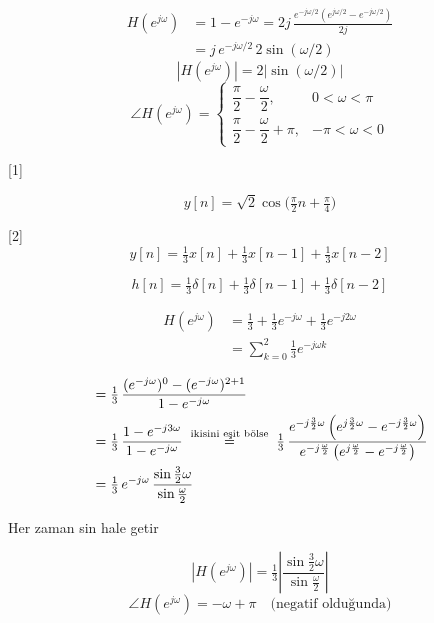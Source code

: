 \documentclass[11pt,a4paper]{article}
\begin{document}
\[ \begin{aligned}
H(e^{j\omega}) &= 1 - e^{-j\omega} = 2j\,\frac{e^{-j\omega/2}\left(e^{j\omega/2}-e^{-j\omega/2}\right)}{2j} \\
&= j\,e^{-j\omega/2}\,2\sin(\omega/2)
\end{aligned} \]
\[ |H(e^{j\omega})| = 2\left|\sin(\omega/2)\right| \]
\[ \angle H(e^{j\omega}) = \begin{cases} \dfrac{\pi}{2} - \dfrac{\omega}{2}, & 0<\omega<\pi \\[4pt] \dfrac{\pi}{2} - \dfrac{\omega}{2} + \pi, & -\pi<\omega<0 \end{cases} \]

[1]

\[ y[n] = \sqrt{2}\cos\!\Big(\tfrac{\pi}{2}n + \tfrac{\pi}{4}\Big) \]

[2]
\[ y[n] = \tfrac13 x[n] + \tfrac13 x[n-1] + \tfrac13 x[n-2] \]

\[ h[n] = \tfrac13\delta[n] + \tfrac13\delta[n-1] + \tfrac13\delta[n-2] \]

\[ \begin{aligned}
H(e^{j\omega}) &= \tfrac13 + \tfrac13 e^{-j\omega} + \tfrac13 e^{-j2\omega} \\
&= \sum_{k=0}^{2} \tfrac13 e^{-j\omega k}
\end{aligned} \]


\[ \begin{aligned}
&= \tfrac13\,\frac{(e^{-j\omega})^{0}-(e^{-j\omega})^{2+1}}{1-e^{-j\omega}} \\
&= \tfrac13\,\frac{1-e^{-j3\omega}}{1-e^{-j\omega}} \;\overset{\text{\scriptsize ikisini eşit bölse}}{=}\; \tfrac13\,\frac{e^{-j\frac32\omega}\left(e^{j\frac32\omega}-e^{-j\frac32\omega}\right)}{e^{-j\frac{\omega}{2}}\left(e^{j\frac{\omega}{2}}-e^{-j\frac{\omega}{2}}\right)} \\
&= \tfrac13\,e^{-j\omega}\,\frac{\sin\frac32\omega}{\sin\frac{\omega}{2}}
\end{aligned} \]

\begin{dikkat}
Her zaman sin hale getir
\end{dikkat}

\[ |H(e^{j\omega})| = \tfrac13\left|\frac{\sin\frac32\omega}{\sin\frac{\omega}{2}}\right| \]
\[ \angle H(e^{j\omega}) = -\omega + \pi \quad \text{(negatif olduğunda)} \]
\end{document}
